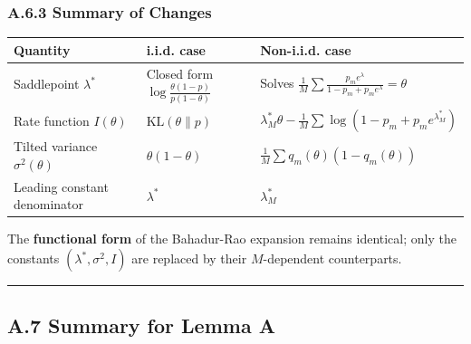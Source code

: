 \documentclass[
  12pt,
]{article}
\begin{document}
\subsubsection{A.6.3 Summary of Changes}\label{a.6.3-summary-of-changes}

\begin{longtable}[]{@{}
  >{\raggedright\arraybackslash}p{}
  >{\raggedright\arraybackslash}p{}
  >{\raggedright\arraybackslash}p{}@{}}
\toprule\noalign{}
\begin{minipage}[b]{\linewidth}\raggedright
Quantity
\end{minipage} & \begin{minipage}[b]{\linewidth}\raggedright
i.i.d. case
\end{minipage} & \begin{minipage}[b]{\linewidth}\raggedright
Non-i.i.d. case
\end{minipage} \\
\midrule\noalign{}
\endhead
\bottomrule\noalign{}
\endlastfoot
Saddlepoint \(\lambda^*\) & Closed form
\(\log\frac{\theta(1-p)}{p(1-\theta)}\) & Solves
\(\frac1M\sum \frac{p_m e^\lambda}{1-p_m+p_m e^\lambda} = \theta\) \\
Rate function \(I(\theta)\) & \(\text{KL}(\theta\|p)\) &
\(\lambda_M^*\theta - \frac1M\sum\log(1-p_m+p_m e^{\lambda_M^*})\) \\
Tilted variance \(\sigma^2(\theta)\) & \(\theta(1-\theta)\) &
\(\frac1M\sum q_m(\theta)(1-q_m(\theta))\) \\
Leading constant denominator & \(\lambda^*\) & \(\lambda_M^*\) \\
\end{longtable}

The \textbf{functional form} of the Bahadur-Rao expansion remains
identical; only the constants \((\lambda^*, \sigma^2, I)\) are replaced
by their \(M\)-dependent counterparts.

\begin{center}\rule{0.5\linewidth}{0.5pt}\end{center}

\subsection{A.7 Summary for Lemma A}\label{a.7-summary-for-lemma-a}
\end{document}
